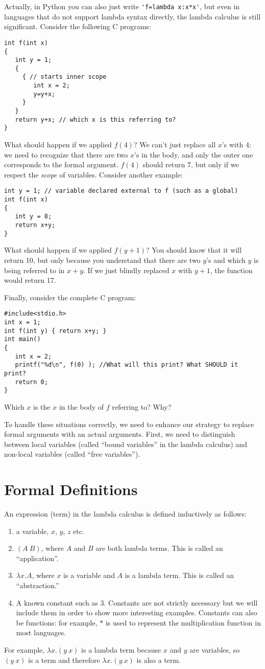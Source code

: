 Actually, in Python you can also just write \verb+'f=lambda x:x*x'+,
but even in languages that do not support lambda
syntax directly, the lambda calculus is still significant.
Consider the following C programs:
\begin{verbatim}
int f(int x) 
{
   int y = 1;
   { 
     { // starts inner scope
        int x = 2;
        y=y+x;
     }
   }
   return y+x; // which x is this referring to?
}
\end{verbatim}
What should happen if we applied $f(4)$?  We can't just replace all $x$'s with $4$:
we need to recognize that there are two $x$'s in the body, and only the outer one
corresponds to the formal argument.  $f(4)$ should return 7, but only if we
respect the {\em scope\/} of variables.  Consider another example:
\begin{verbatim}
int y = 1; // variable declared external to f (such as a global)
int f(int x)
{
   int y = 8;
   return x+y;
}
\end{verbatim}
What should happen if we applied $f(y+1)$?  You should know that it will
return 10, but only because you understand that there are two $y$'s and
which $y$ is being referred to in $x+y$. If we just blindly replaced $x$ with
$y+1$, the function would return 17.

Finally, consider the complete C program:
\begin{verbatim}
#include<stdio.h>
int x = 1;
int f(int y) { return x+y; }
int main()
{
   int x = 2;
   printf("%d\n", f(0) ); //What will this print? What SHOULD it print?
   return 0;
}
\end{verbatim}
Which $x$ is the $x$ in the body of $f$ referring to? Why?

To handle these situations correctly, we need to enhance our strategy to
replace formal arguments with an actual arguments.  First, we
need to distinguish between local variables (called ``bound variables''
in the lambda calculus) and non-local variables (called ``free variables'').


\section{Formal Definitions}

An expression (term) in the lambda calculus is defined inductively as follows:
\begin{enumerate}
\item a variable, $x$, $y$, $z$ etc.
\item $(A ~B)$, where $A$ and $B$ are both lambda terms.  This is called an
  ``application''.
\item $\lambda x.A$, where $x$ is a variable and $A$ is a lambda term.  This is
  called an ``abstraction.''
\item  A known constant such as $3$.  Constants are not strictly necessary but
  we will include them in order to show more interesting examples.  Constants
  can also be functions: for example, $*$ is used to represent the multiplication
  function in most languages.
\end{enumerate}
For example, $\lambda x.(y~x)$ is a lambda term because $x$ and $y$ are variables,
so $(y~x)$ is a term and therefore $\lambda x.(y~x)$ is also a term.


